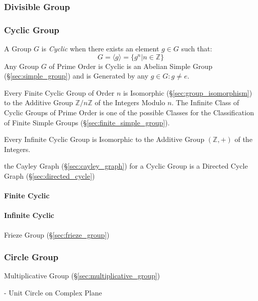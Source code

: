 \subsubsection{Divisible Group}\label{sec:divisible_group}

\subsubsection{Cyclic Group}\label{sec:cyclic_group}

A Group $G$ is \emph{Cyclic} when there exists an element $g \in G$ such that:
\[
    G = \langle g \rangle = \{ g^n | n \in \mathbb{Z} \}
\]
Any Group $G$ of Prime Order is Cyclic is an Abelian Simple Group
(\S\ref{sec:simple_group}) and is Generated by any $g \in G : g \neq
e$.

Every Finite Cyclic Group of Order $n$ is Isomorphic
(\S\ref{sec:group_isomorphism}) to the Additive Group $\mathbb{Z}/n\mathbb{Z}$
of the Integers Modulo $n$. The Infinite Class of Cyclic Groups of Prime Order
is one of the possible Classes for the Classification of Finite Simple Groups
(\S\ref{sec:finite_simple_group}).

Every Infinite Cyclic Group is Isomorphic to the Additive Group $(\mathbb{Z},
+)$ of the Integers.

the Cayley Graph (\S\ref{sec:cayley_graph}) for a Cyclic Group is a
Directed Cycle Graph (\S\ref{sec:directed_cycle})



\paragraph{Finite Cyclic}\label{sec:finite_cyclic}\hfill

\paragraph{Infinite Cyclic}\label{sec:infinite_cyclic}\hfill

Frieze Group (\S\ref{sec:frieze_group})



\subsubsection{Circle Group}\label{sec:circle_group}

Multiplicative Group (\S\ref{sec:multiplicative_group})

- Unit Circle on Complex Plane

